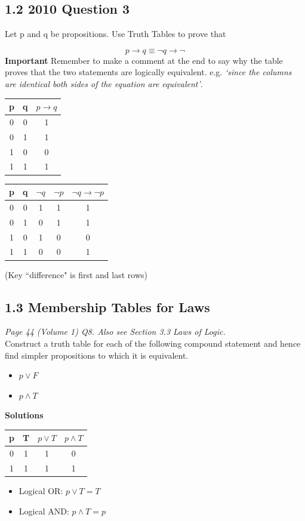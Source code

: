 \documentclass[]{report}
\begin{document}
\subsection*{1.2 2010 Question 3}

Let p and q be propositions. Use Truth Tables to prove that

\[ p \rightarrow q \equiv \neg q \rightarrow \neg\]
\textbf{Important} Remember to make a comment at the end to say why the table proves that the two statements are logically equivalent. e.g. \emph{‘since the columns are identical both sides of the equation are equivalent’}.
{ 
\begin{tabular}{|c|c||c|}
\hline  p&  q& $p \rightarrow q$ \\ 
\hline  0&  0&  1\\ 
\hline  0&  1&  1\\ 
\hline  1&  0&  0\\ 
\hline  1&  1&  1\\ 
\hline 
\end{tabular} \hspace{0.5cm} \begin{tabular}{|c|c||c|c|c|}
\hline  p&  q& $\neg q$ & $\neg p$ & $\neg q \rightarrow \neg p$ \\ 
\hline  0&  0& 1& 1& 1\\ 
\hline  0&  1& 0& 1& 1\\ 
\hline  1&  0& 1& 0& 0\\ 
\hline  1&  1& 0& 0& 1\\ 
\hline 
\end{tabular}
} 
(Key ``difference" is first and last rows)
\subsection*{1.3 Membership Tables for Laws}
\emph{Page 44 (Volume 1) Q8.
Also see Section 3.3 Laws of Logic.}\\

Construct a truth table for each of the following compound statement and hence find simpler propositions to which it is equivalent.


\begin{itemize}
\item $p \vee F$
\item $p \wedge T$
\end{itemize}
\textbf{Solutions}
\begin{center}
{
\begin{tabular}{|c|c||c|c|}
\hline  p & T & $p \vee T$ & $ p \wedge T$ \\ \hline
\hline  0 & 1 & 1 & 0 \\ 
\hline  1 &  1 & 1 & 1 \\ 
\hline 
\end{tabular} 
}
\end{center}
\begin{itemize}
\item Logical OR: $p \vee T = T $
\item Logical AND: $p \wedge T = p  $
\end{itemize}
\end{document}
